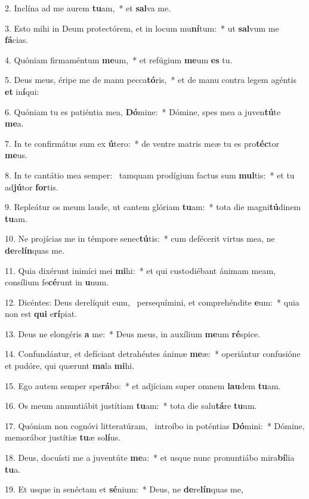 2. Inclína ad me aurem \textbf{tu}am,~*  et \textbf{sal}va me.\

3. Esto mihi in Deum protectórem, et in locum mu\textbf{ní}tum:~*  ut \textbf{sal}vum me \textbf{fá}cias.\

4. Quóniam firmaméntum \textbf{me}um,~*  et refúgium \textbf{me}um \textbf{es} tu.\

5. Deus meus, éripe me de manu pecca\textbf{tó}ris,~*  et de manu contra legem agéntis \textbf{et} in\textbf{í}qui:\

6. Quóniam tu es patiéntia mea, \textbf{Dó}mine:~*  Dómine, spes mea a juven\textbf{tú}te \textbf{me}a.\

7. In te confirmátus sum ex \textbf{ú}tero:~*  de ventre matris meæ tu es pro\textbf{téc}tor \textbf{me}us.\

8. In te cantátio mea semper: \dag\  tamquam prodígium factus sum \textbf{mul}tis:~*  et tu ad\textbf{jú}tor \textbf{for}tis.\

9. Repleátur os meum laude, ut cantem glóriam \textbf{tu}am:~*  tota die magni\textbf{tú}dinem \textbf{tu}am.\

10. Ne projícias me in témpore senec\textbf{tú}tis:~*  cum defécerit virtus mea, ne \textbf{de}re\textbf{lín}quas me.\

11. Quia dixérunt inimíci mei \textbf{mi}hi:~*  et qui custodiébant ánimam meam, consílium fe\textbf{cé}runt in \textbf{u}num.\

12. Dicéntes: Deus derelíquit eum, \dag\  persequímini, et comprehéndite \textbf{e}um:~*  quia non est \textbf{qui} e\textbf{rí}piat.\

13. Deus ne elongéris \textbf{a} me:~*  Deus meus, in auxílium \textbf{me}um \textbf{ré}spice.\

14. Confundántur, et defíciant detrahéntes ánimæ \textbf{me}æ:~*  operiántur confusióne et pudóre, qui quærunt \textbf{ma}la \textbf{mi}hi.\

15. Ego autem semper spe\textbf{rá}bo:~*  et adjíciam super omnem \textbf{lau}dem \textbf{tu}am.\

16. Os meum annuntiábit justítiam \textbf{tu}am:~*  tota die salu\textbf{tá}re \textbf{tu}um.\

17. Quóniam non cognóvi litteratúram, \dag\  introíbo in poténtias \textbf{Dó}mini:~*  Dómine, memorábor justítiæ \textbf{tu}æ so\textbf{lí}us.\

18. Deus, docuísti me a juventúte \textbf{me}a:~*  et usque nunc pronuntiábo mira\textbf{bí}lia \textbf{tu}a.\

19. Et usque in senéctam et \textbf{sé}nium:~*  Deus, ne \textbf{de}re\textbf{lín}quas me,\

